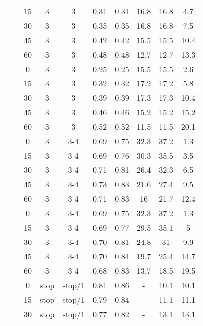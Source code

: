 \begin{longtable}[t]{cccccccccc}
\nopagebreak
&  & 15 & 3 & 3 & 0.31 & 0.31 & 16.8 & 16.8 & 4.7\\
\nopagebreak
&  & 30 & 3 & 3 & 0.35 & 0.35 & 16.8 & 16.8 & 7.5\\
\nopagebreak
&  & 45 & 3 & 3 & 0.42 & 0.42 & 15.5 & 15.5 & 10.4\\
\nopagebreak
& \multirow{-5}{*}{\centering\arraybackslash 0.2} & 60 & 3 & 3 & 0.48 & 0.48 & 12.7 & 12.7 & 13.3\\
\nopagebreak
&  & 0 & 3 & 3 & 0.25 & 0.25 & 15.5 & 15.5 & 2.6\\
\nopagebreak
&  & 15 & 3 & 3 & 0.32 & 0.32 & 17.2 & 17.2 & 5.8\\
\nopagebreak
&  & 30 & 3 & 3 & 0.39 & 0.39 & 17.3 & 17.3 & 10.4\\
\nopagebreak
&  & 45 & 3 & 3 & 0.46 & 0.46 & 15.2 & 15.2 & 15.2\\
\nopagebreak
\multirow{-10}{*}{\centering\arraybackslash 3} & \multirow{-5}{*}{\centering\arraybackslash 0.33} & 60 & 3 & 3 & 0.52 & 0.52 & 11.5 & 11.5 & 20.1\\
\cmidrule{1-10}\pagebreak[0]
&  & 0 & 3 & 3-4 & 0.69 & 0.75 & 32.3 & 37.2 & 1.3\\
\nopagebreak
&  & 15 & 3 & 3-4 & 0.69 & 0.76 & 30.3 & 35.5 & 3.5\\
\nopagebreak
&  & 30 & 3 & 3-4 & 0.71 & 0.81 & 26.4 & 32.3 & 6.5\\
\nopagebreak
&  & 45 & 3 & 3-4 & 0.73 & 0.83 & 21.6 & 27.4 & 9.5\\
\nopagebreak
& \multirow{-5}{*}{\centering\arraybackslash 0.2} & 60 & 3 & 3-4 & 0.71 & 0.83 & 16 & 21.7 & 12.4\\
\nopagebreak
&  & 0 & 3 & 3-4 & 0.69 & 0.75 & 32.3 & 37.2 & 1.3\\
\nopagebreak
&  & 15 & 3 & 3-4 & 0.69 & 0.77 & 29.5 & 35.1 & 5\\
\nopagebreak
&  & 30 & 3 & 3-4 & 0.70 & 0.81 & 24.8 & 31 & 9.9\\
\nopagebreak
&  & 45 & 3 & 3-4 & 0.70 & 0.84 & 19.7 & 25.4 & 14.7\\
\nopagebreak
\multirow{-10}{*}{\centering\arraybackslash 4} & \multirow{-5}{*}{\centering\arraybackslash 0.33} & 60 & 3 & 3-4 & 0.68 & 0.83 & 13.7 & 18.5 & 19.5\\
\cmidrule{1-10}\pagebreak[0]
&  & 0 & stop & stop/1 & 0.81 & 0.86 & - & 10.1 & 10.1\\
\nopagebreak
&  & 15 & stop & stop/1 & 0.79 & 0.84 & - & 11.1 & 11.1\\
\nopagebreak
&  & 30 & stop & stop/1 & 0.77 & 0.82 & - & 13.1 & 13.1\\

\end{longtable}

